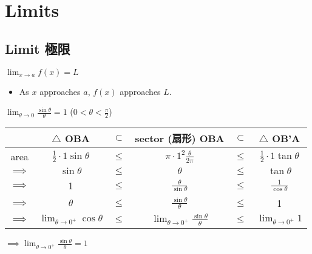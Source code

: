 %
%
\graphicspath{{./figures/limits/}}


\chapter{Limits}\label{chap limits}
\section{Limit 極限}
\begin{defn}
$\displaystyle \lim_{x \to a} f(x) = L$
\begin{itemize}
\item As $x$ approaches $a$, $f(x)$ approaches $L$.
\end{itemize} 
\end{defn}

$\displaystyle \lim_{\theta \to 0} \frac{\sin \theta}{\theta} = 1$ ($0 < \theta < \displaystyle \frac{\pi}{2}$)\\

\begin{tabular}{c|ccccc}
&$\bigtriangleup$ OBA & $\subset$ & sector (扇形) OBA & $\subset$ &$\bigtriangleup$ OB'A\\\hline
area & $\displaystyle \frac{1}{2} \cdot 1 \sin \theta$ & $\leq$ & $\displaystyle \pi \cdot 1^2 \frac{\theta}{2\pi}$ & $\leq$ & $\displaystyle \frac{1}{2} \cdot 1 \tan \theta$\\
$\implies$ & $\sin \theta$ & $\leq$ & $\theta$ & $\leq$ & $\tan \theta$\\
$\implies$ & 1 & $\leq$ & $\displaystyle \frac{\theta}{\sin \theta}$ & $\leq$ & $\displaystyle \frac{1}{\cos \theta}$\\
$\implies$ & $\theta$ & $\leq$ & $\displaystyle \frac{\sin \theta}{\theta}$ & $\leq$ & 1\\
$\implies$ & $\displaystyle \lim_{\theta \to 0^{+}} \cos \theta$ & $\leq$ & $\displaystyle \lim_{\theta \to 0^{+}} \frac{\sin \theta}{\theta}$ & $\leq$ & $\displaystyle \lim_{\theta \to 0^{+}} 1$\\
\end{tabular}

$\implies \displaystyle \lim_{\theta \to 0^{+}} \frac{\sin \theta}{\theta} = 1$

